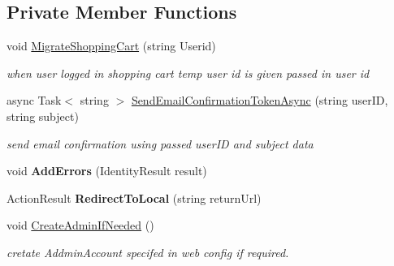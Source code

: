 \subsection*{Private Member Functions}
\begin{DoxyCompactItemize}
\item 
void \hyperlink{class_alfa_accounting_1_1_controllers_1_1_account_controller_a87ae473251c220a1da2786b60780c8e7}{Migrate\+Shopping\+Cart} (string Userid)
\begin{DoxyCompactList}\small\item\em when user logged in shopping cart temp user id is given passed in user id \end{DoxyCompactList}\item 
async Task$<$ string $>$ \hyperlink{class_alfa_accounting_1_1_controllers_1_1_account_controller_a1fa3a682bb8d5ec0d2338412decc261a}{Send\+Email\+Confirmation\+Token\+Async} (string user\+ID, string subject)
\begin{DoxyCompactList}\small\item\em send email confirmation using passed user\+ID and subject data \end{DoxyCompactList}\item 
\mbox{\label{class_alfa_accounting_1_1_controllers_1_1_account_controller_ac71173e2b61957f19b3bf18ddff3d350}} 
void {\bfseries Add\+Errors} (Identity\+Result result)
\item 
\mbox{\label{class_alfa_accounting_1_1_controllers_1_1_account_controller_a3cf6df00103aab96806529581aeefd69}} 
Action\+Result {\bfseries Redirect\+To\+Local} (string return\+Url)
\item 
void \hyperlink{class_alfa_accounting_1_1_controllers_1_1_account_controller_aac2167dbfab02458f4bb690ed818e946}{Create\+Admin\+If\+Needed} ()
\begin{DoxyCompactList}\small\item\em cretate Addmin\+Account specifed in web config if required. \end{DoxyCompactList}\end{DoxyCompactItemize}
